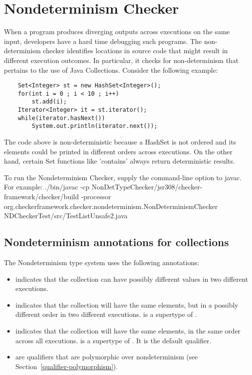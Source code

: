 \htmlhr
\chapter{Nondeterminism Checker\label{nondeterminism-checker}}
When a program produces diverging outputs across executions on the same input, developers
have a hard time debugging such programs. 
The non-determinism checker identifies locations in source code that might result in different execution outcomes. 
In particular, it checks for non-determinism that pertains to the use of Java Collections.
Consider the following example:
\begin{Verbatim}
	Set<Integer> st = new HashSet<Integer>(); 
	for(int i = 0 ; i < 10 ; i++)
		st.add(i);
	Iterator<Integer> it = st.iterator();
	while(iterator.hasNext())
		System.out.println(iterator.next());

\end{Verbatim}

The code above is non-deterministic because a HashSet is not ordered and its elements could be printed in different orders across executions.
On the other hand, certain Set functions like 'contains' always return deterministic results.

To run the Nondeterminism Checker, supply the
command-line option to javac.
For example: ./bin/javac -cp NonDetTypeChecker/jsr308/checker-framework/checker/build -processor org.checkerframework.checker.nondeterminism.NonDeterminismChecker NDCheckerTest/src/TestListUnsafe2.java

\section{Nondeterminism annotations for collections\label{nondeterminism-annotations-collections}}

The Nondeterminism type system uses the following annotations:
\begin{itemize}
\item
   indicates
  that the collection can have possibly different values in two different executions.
\item
   indicates that
  the collection will have the same elements, but in a possibly different order in two different executions.
   is a supertype of .
 \item
   indicates that
  the collection will have the same elements, in the same order across all executions.
   is a supertype of .
   It is the default qualifier.
\item
   are qualifiers that are
  polymorphic over nondeterminism (see Section~\ref{qualifier-polymorphism}).
\end{itemize}


